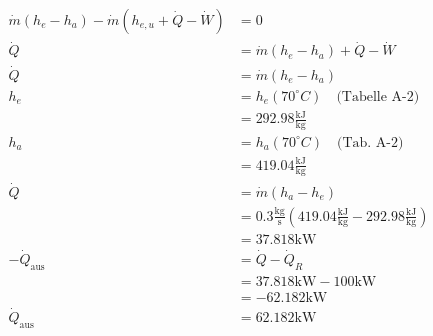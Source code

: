 

\item[a)]
    \begin{align*}
        \dot{m} (h_e - h_a) - \dot{m} (h_{e,u} + \dot{Q} - \dot{W}) &= 0 \\
        \dot{Q} &= \dot{m} (h_e - h_a) + \dot{Q} - \dot{W} \\
        \dot{Q} &= \dot{m} (h_e - h_a) \\
        h_e &= h_e (70^\circ C) \quad \text{(Tabelle A-2)} \\
        &= 292.98 \frac{\text{kJ}}{\text{kg}} \\
        h_a &= h_a (70^\circ C) \quad \text{(Tab. A-2)} \\
        &= 419.04 \frac{\text{kJ}}{\text{kg}} \\
        \dot{Q} &= \dot{m} (h_a - h_e) \\
        &= 0.3 \frac{\text{kg}}{\text{s}} (419.04 \frac{\text{kJ}}{\text{kg}} - 292.98 \frac{\text{kJ}}{\text{kg}}) \\
        &= 37.818 \text{kW} \\
        -\dot{Q}_{\text{aus}} &= \dot{Q} - \dot{Q}_R \\
        &= 37.818 \text{kW} - 100 \text{kW} \\
        &= -62.182 \text{kW} \\
        \dot{Q}_{\text{aus}} &= 62.182 \text{kW}
    \end{align*}